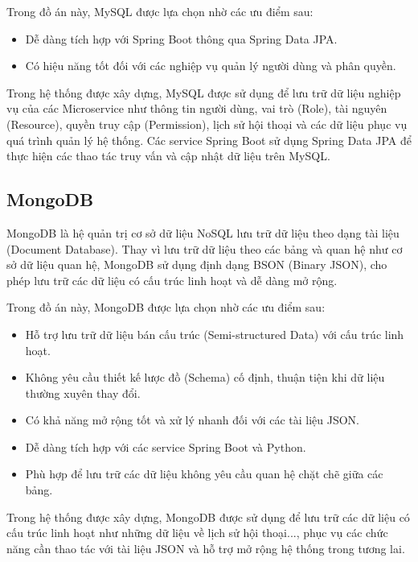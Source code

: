 \documentclass[../DoAn.tex]{subfiles}
\begin{document}
Trong đồ án này, MySQL được lựa chọn nhờ các ưu điểm sau:

\begin{itemize}
    \item Dễ dàng tích hợp với Spring Boot thông qua Spring Data JPA.
    
    \item Có hiệu năng tốt đối với các nghiệp vụ quản lý người dùng và phân quyền.
    
\end{itemize}

Trong hệ thống được xây dựng, MySQL được sử dụng để lưu trữ dữ liệu nghiệp vụ của các Microservice như thông tin người dùng, vai trò (Role), tài nguyên (Resource), quyền truy cập (Permission), lịch sử hội thoại và các dữ liệu phục vụ quá trình quản lý hệ thống. Các service Spring Boot sử dụng Spring Data JPA để thực hiện các thao tác truy vấn và cập nhật dữ liệu trên MySQL.

\subsection{MongoDB}

MongoDB là hệ quản trị cơ sở dữ liệu NoSQL lưu trữ dữ liệu theo dạng tài liệu (Document Database). Thay vì lưu trữ dữ liệu theo các bảng và quan hệ như cơ sở dữ liệu quan hệ, MongoDB sử dụng định dạng BSON (Binary JSON), cho phép lưu trữ các dữ liệu có cấu trúc linh hoạt và dễ dàng mở rộng.

Trong đồ án này, MongoDB được lựa chọn nhờ các ưu điểm sau:

\begin{itemize}
    \item Hỗ trợ lưu trữ dữ liệu bán cấu trúc (Semi-structured Data) với cấu trúc linh hoạt.

    \item Không yêu cầu thiết kế lược đồ (Schema) cố định, thuận tiện khi dữ liệu thường xuyên thay đổi.

    \item Có khả năng mở rộng tốt và xử lý nhanh đối với các tài liệu JSON.

    \item Dễ dàng tích hợp với các service Spring Boot và Python.

    \item Phù hợp để lưu trữ các dữ liệu không yêu cầu quan hệ chặt chẽ giữa các bảng.
\end{itemize}

Trong hệ thống được xây dựng, MongoDB được sử dụng để lưu trữ các dữ liệu có cấu trúc linh hoạt như những dữ liệu về lịch sử hội thoại..., phục vụ các chức năng cần thao tác với tài liệu JSON và hỗ trợ mở rộng hệ thống trong tương lai.
\end{document}
